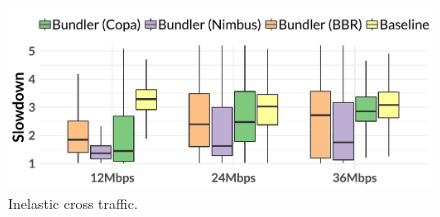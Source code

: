 \begin{figure}
    \centering
\begin{knitrout}
\color{fgcolor}
\includegraphics[width=\maxwidth]{figure/robust:cr-inelastic-1} 

\end{knitrout}
    \caption{Inelastic cross traffic.}
    \label{fig:robust:cr-inelastic}
\end{figure}
